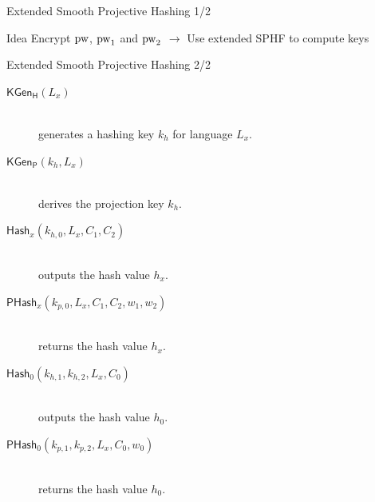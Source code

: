 \documentclass[notes,xcolor=dvipsnames]{beamer}
\begin{document}
\begin{frame}{Extended Smooth Projective Hashing 1/2}


\begin{figure}
\end{figure}

%
%
\begin{beamerboxesrounded}[upper=uppercol,lower=lowercol,shadow=true]{\centering Idea}
	Encrypt $\mathrm{pw}$, $\mathrm{pw}_1$ and $\mathrm{pw}_2$ $\rightarrow$ Use extended SPHF to compute keys
\end{beamerboxesrounded}

\end{frame}

\begin{frame}{Extended Smooth Projective Hashing 2/2}

\begin{description}
	\item[$\mathsf{KGen_H}(L_x)$]\hfill\\ generates a hashing key $k_h$ for language $L_x$.
	\item[$\mathsf{KGen_P}(k_h,L_x)$]\hfill\\ derives the projection key $k_h$.
	\item[$\mathsf{Hash}_x (k_{h,0},L_x,C_1,C_2)$]\hfill\\ outputs the hash value $h_x$.
	\item[$\mathsf{PHash}_x (k_{p,0},L_x,C_1,C_2,w_1,w_2)$]\hfill\\ returns the hash value $h_x$.
	\item[$\mathsf{Hash}_0(k_{h,1},k_{h,2},L_x,C_0)$]\hfill\\ outputs the hash value $h_0$.
	\item[$\mathsf{PHash}_0(k_{p,1},k_{p,2},L_x,C_0,w_0)$]\hfill\\ returns the hash value $h_0$.
\end{description}

\end{frame}
\end{document}
